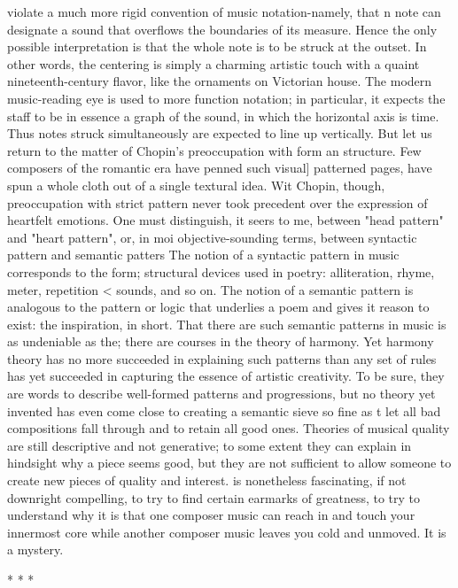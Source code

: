  violate a much more rigid convention of music notation-namely, that n note can
designate a sound that overflows the boundaries of its measure. Hence the only possible
interpretation is that the whole note is to be struck at the outset. In other words, the
centering is simply a charming artistic touch with a quaint nineteenth-century flavor, like
the ornaments on Victorian house. The modern music-reading eye is used to more
function notation; in particular, it expects the staff to be in essence a graph of the sound,
in which the horizontal axis is time. Thus notes struck simultaneously are expected to line
up vertically.
         But let us return to the matter of Chopin's preoccupation with form an structure.
Few composers of the romantic era have penned such visual] patterned pages, have spun
a whole cloth out of a single textural idea. Wit Chopin, though, preoccupation with strict
pattern never took precedent over the expression of heartfelt emotions. One must
distinguish, it seers to me, between "head pattern" and "heart pattern", or, in moi
objective-sounding terms, between syntactic pattern and semantic patters The notion of a
syntactic pattern in music corresponds to the form; structural devices used in poetry:
alliteration, rhyme, meter, repetition < sounds, and so on. The notion of a semantic
pattern is analogous to the pattern or logic that underlies a poem and gives it reason to
exist: the inspiration, in short.
         That there are such semantic patterns in music is as undeniable as the; there are
courses in the theory of harmony. Yet harmony theory has no more succeeded in
explaining such patterns than any set of rules has yet succeeded in capturing the essence
of artistic creativity. To be sure, they are words to describe well-formed patterns and
progressions, but no theory yet invented has even come close to creating a semantic sieve
so fine as t let all bad compositions fall through and to retain all good ones. Theories of
musical quality are still descriptive and not generative; to some extent they can explain in
hindsight why a piece seems good, but they are not sufficient to allow someone to create
new pieces of quality and interest. is nonetheless fascinating, if not downright
compelling, to try to find certain earmarks of greatness, to try to understand why it is that
one composer music can reach in and touch your innermost core while another composer
music leaves you cold and unmoved. It is a mystery.

                                           *     *     *

